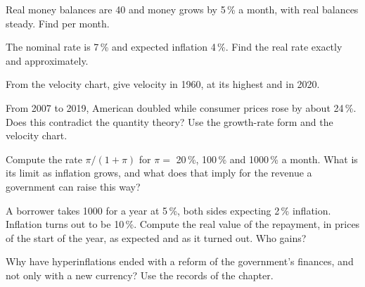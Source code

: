 \begin{exercise}[$\star\star$]\label{exo:g12:inflation-and-money:9}
Real money balances are 40 and money grows by 5\,\% a month, with real balances steady. Find  per month.
\end{exercise}

\begin{exercise}[$\star\star$]\label{exo:g12:inflation-and-money:10}
The nominal rate is 7\,\% and expected inflation 4\,\%. Find the real rate exactly and approximately.
\end{exercise}

\begin{exercise}[$\star\star$]\label{exo:g12:inflation-and-money:11}
From the velocity chart, give velocity in 1960, at its highest and in 2020.
\end{exercise}

\begin{exercise}[$\star\star\star$]\label{exo:g12:inflation-and-money:12}
From 2007 to 2019, American  doubled while consumer prices rose by about 24\,\%. Does this contradict the quantity theory? Use the growth-rate form and the
velocity chart.
\end{exercise}

\begin{exercise}[$\star\star\star$]\label{exo:g12:inflation-and-money:13}
Compute the  rate $\pi/(1 + \pi)$ for $\pi = $ 20\,\%, 100\,\% and 1000\,\% a month. What is its limit as inflation grows, and what does that imply for the
revenue a government can raise this way?
\end{exercise}

\begin{exercise}[$\star\star\star$]\label{exo:g12:inflation-and-money:14}
A borrower takes 1000 for a year at 5\,\%, both sides expecting 2\,\% inflation. Inflation turns out to be 10\,\%. Compute the real value of the repayment, in prices of the
start of the year, as expected and as it turned out. Who gains?
\end{exercise}

\begin{exercise}[$\star\star\star$]\label{exo:g12:inflation-and-money:15}
Why have hyperinflations ended with a reform of the government's finances, and not only with a new currency? Use the records of the chapter.
\end{exercise}

